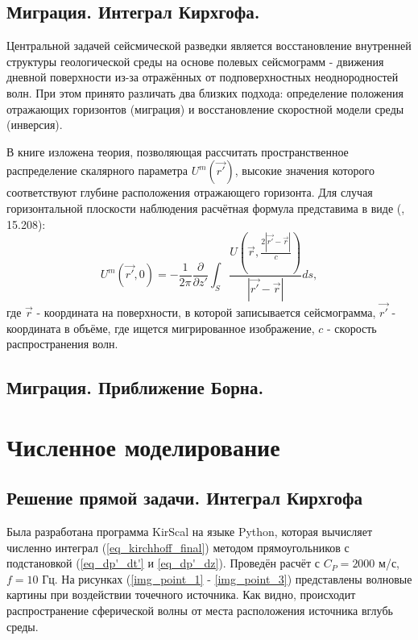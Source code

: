 \documentclass{article}
\begin{document}
\subsection{Миграция. Интеграл Кирхгофа.}

Центральной задачей сейсмической разведки является восстановление внутренней структуры геологической среды на основе полевых сейсмограмм - движения дневной поверхности
из-за отражённых от подповерхностных неоднородностей волн.
При этом принято различать два близких подхода: определение положения отражающих горизонтов (миграция) и восстановление скоростной модели среды (инверсия).

В книге \cite{Zhdanov_2007} изложена теория, позволяющая рассчитать пространственное распределение скалярного параметра $U^m(\vec{r'})$, высокие значения которого соответствуют
глубине расположения отражающего горизонта.
Для случая горизонтальной плоскости наблюдения расчётная формула представима в виде (\cite{Zhdanov_2007}, 15.208):
\begin{equation}
\label{rayleigh_migration}
U^m(\vec{r'},0) = -\frac{1}{2\pi}\frac{\partial}{\partial z'}
	\int_S \frac{U(\vec{r},\frac{2|\vec{r'}-\vec{r}|}{c})}{|\vec{r'}-\vec{r}|}ds,
\end{equation}
где $\vec{r}$ - координата на поверхности, в которой записывается сейсмограмма, $\vec{r'}$ - координата в объёме, где ищется мигрированное изображение, $c$ - скорость распространения волн.

\subsection{Миграция. Приближение Борна.}

\section{Численное моделирование}

\subsection{Решение прямой задачи. Интеграл Кирхгофа}

Была разработана программа KirScal на языке Python, которая вычисляет численно интеграл (\ref{eq_kirchhoff_final}) методом прямоугольников с подстановкой (\ref{eq_dp'_dt'} и \ref{eq_dp'_dz}).
Проведён расчёт с $C_P = 2000$ м/с, $f = 10$ Гц.
На рисунках (\ref{img_point_1} - \ref{img_point_3}) представлены волновые картины при воздействии точечного источника.
Как видно, происходит распространение сферической волны от места расположения источника вглубь среды.
\end{document}
